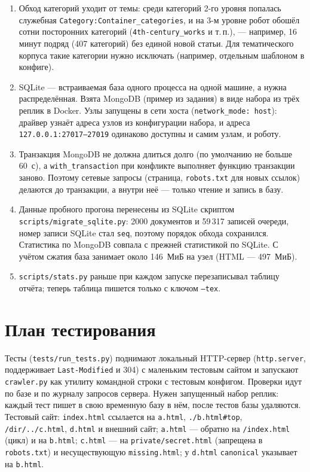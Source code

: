 \begin{enumerate}
    \item Обход категорий уходит от темы: среди категорий 2-го уровня попалась служебная \texttt{Category:Container\_categories}, и на 3-м уровне робот обошёл сотни посторонних категорий (\texttt{4th-century\_works} и т.\,п.), --- например, 16 минут подряд (407 категорий) без единой новой статьи. Для тематического корпуса такие категории нужно исключать (например, отдельным шаблоном в конфиге).
    \item SQLite --- встраиваемая база одного процесса на одной машине, а нужна распределённая. Взята MongoDB (пример из задания) в виде набора из трёх реплик в Docker. Узлы запущены в сети хоста (\texttt{network\_mode: host}): драйвер узнаёт адреса узлов из конфигурации набора, и адреса \texttt{127.0.0.1:27017--27019} одинаково доступны и самим узлам, и роботу.
    \item Транзакция MongoDB не должна длиться долго (по умолчанию не больше 60~с), а \texttt{with\_transaction} при конфликте выполняет функцию транзакции заново. Поэтому сетевые запросы (страница, \texttt{robots.txt} для новых ссылок) делаются до транзакции, а внутри неё --- только чтение и запись в базу.
    \item Данные пробного прогона перенесены из SQLite скриптом \texttt{scripts/migrate\_sqlite.py}: 2000 документов и 59\,317 записей очереди, номер записи SQLite стал \texttt{seq}, поэтому порядок обхода сохранился. Статистика по MongoDB совпала с прежней статистикой по SQLite. С учётом сжатия база занимает около 146~МиБ на узел (HTML --- 497~МиБ).
    \item \texttt{scripts/stats.py} раньше при каждом запуске перезаписывал таблицу отчёта; теперь таблица пишется только с ключом \texttt{--tex}.
\end{enumerate}

\section{План тестирования}
Тесты (\texttt{tests/run\_tests.py}) поднимают локальный HTTP-сервер (\texttt{http.server}, поддерживает \texttt{Last-Modified} и 304) с маленьким тестовым сайтом и запускают \texttt{crawler.py} как утилиту командной строки с тестовым конфигом. Проверки идут по базе и по журналу запросов сервера. Нужен запущенный набор реплик: каждый тест пишет в свою временную базу в нём, после тестов базы удаляются. Тестовый сайт: \texttt{index.html} ссылается на \texttt{a.html}, \texttt{./b.html\#top}, \texttt{/dir/../c.html}, \texttt{d.html} и внешний сайт; \texttt{a.html} --- обратно на \texttt{/index.html} (цикл) и на \texttt{b.html}; \texttt{c.html} --- на \texttt{private/secret.html} (запрещена в \texttt{robots.txt}) и несуществующую \texttt{missing.html}; у \texttt{d.html} \texttt{canonical} указывает на \texttt{b.html}.

